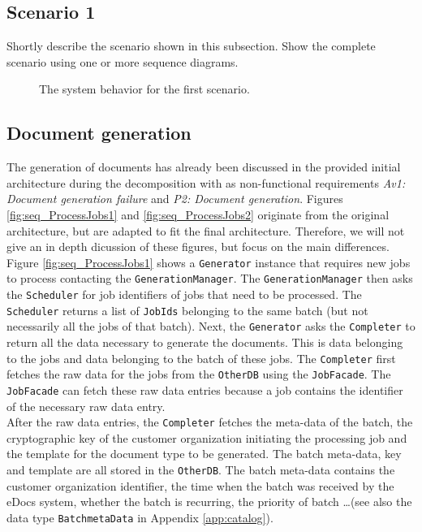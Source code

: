 \documentclass[a4paper,10pt]{article}
\begin{document}
\subsection{Scenario 1}
Shortly describe the scenario shown in this subsection.
Show the complete scenario using one or more sequence diagrams.

\begin{figure}[!htp]
    \centering
    \caption{The system behavior for the first scenario.
        }\label{fig:seq_scenario1}
\end{figure}

\subsection{Document generation}
\label{scenario:DocumentGeneration}
The generation of documents has already been discussed in the provided initial architecture during the decomposition with as non-functional requirements \emph{Av1: Document generation failure} and \emph{P2: Document generation}. Figures \ref{fig:seq_ProcessJobs1} and \ref{fig:seq_ProcessJobs2} originate from the original architecture, but are adapted to fit the final architecture. Therefore, we will not give an in depth dicussion of these figures, but focus on the main differences.\\

Figure \ref{fig:seq_ProcessJobs1} shows a \texttt{Generator} instance that requires new jobs to process contacting the \texttt{GenerationManager}. The \texttt{GenerationManager} then asks the \texttt{Scheduler} for job identifiers of jobs that need to be processed. The \texttt{Scheduler} returns a list of \texttt{JobIds} belonging to the same batch (but not necessarily all the jobs of that batch). Next, the \texttt{Generator} asks the \texttt{Completer} to return all the data necessary to generate the documents. This is data belonging to the jobs and data belonging to the batch of these jobs. The \texttt{Completer} first fetches the raw data for the jobs from the \texttt{OtherDB} using the \texttt{JobFacade}. The \texttt{JobFacade} can fetch these raw data entries because a job contains the identifier of the necessary raw data entry.\\
After the raw data entries, the \texttt{Completer} fetches the meta-data of the batch, the cryptographic key of the customer organization initiating the processing job and the template for the document type to be generated. The batch meta-data, key and template are all stored in the \texttt{OtherDB}. The batch meta-data contains the customer organization identifier, the time when the batch was received by the eDocs system, whether the batch is recurring, the priority of batch \dots (see also the data type \texttt{BatchmetaData} in Appendix \ref{app:catalog}).\\
\end{document}
